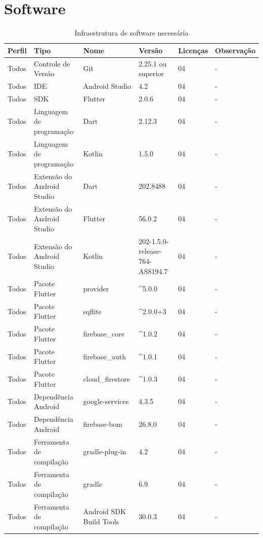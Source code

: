 \documentclass[
	12pt,				%
	oneside,			%
	a4paper,			%
	english,			%
	brazil,				%
	]{abntex2}
\begin{document}
\section{Software}
\begin{table}[ht]
\caption{Infraestrutura de software necessária}%
\label{tab:ambiente_software}
\centering
\IBGEtabfontsize
\begin{tabular}{@{}p{}p{}p{}p{}p{}p{}@{}}
\toprule
\textbf{Perfil} & \textbf{Tipo} & \textbf{Nome} & \textbf{Versão} & \textbf{Licenças}  & \textbf{Observação} \\ \midrule
Todos & Controle de Versão & Git & 2.25.1 ou superior & 04  & - \\ \midrule
Todos & IDE & Android Studio & 4.2 & 04  & - \\ \midrule
Todos & SDK & Flutter & 2.0.6 & 04  & - \\ \midrule
Todos & Linguagem de programação & Dart & 2.12.3 & 04  & - \\ \midrule
Todos & Linguagem de programação & Kotlin & 1.5.0 & 04  & - \\ \midrule
Todos & Extensão do Android Studio & Dart & 202.8488 & 04  & - \\ \midrule
Todos & Extensão do Android Studio & Flutter & 56.0.2 & 04  & - \\ \midrule
Todos & Extensão do Android Studio & Kotlin & 202-1.5.0-release-764-AS8194.7 & 04  & - \\ \midrule
Todos & Pacote Flutter & provider & \^{}5.0.0 & 04 & - \\ \midrule
Todos & Pacote Flutter & sqflite & \^{}2.0.0+3 & 04 & - \\ \midrule
Todos & Pacote Flutter & firebase\_core & \^{}1.0.2 & 04 & - \\ \midrule
Todos & Pacote Flutter & firebase\_auth & \^{}1.0.1 & 04  & - \\ \midrule
Todos & Pacote Flutter & cloud\_firestore & \^{}1.0.3 & 04  & - \\ \midrule
Todos & Dependência Android & google-services & 4.3.5 & 04  & - \\ \midrule
Todos & Dependência Android & firebase-bom & 26.8.0 & 04  & - \\ \midrule
Todos & Ferramenta de compilação & gradle-plug-in & 4.2 & 04  & - \\ \midrule
Todos & Ferramenta de compilação & gradle & 6.9 & 04  & - \\ \midrule
Todos & Ferramenta de compilação & Android SDK Build Tools & 30.0.3 & 04  & - \\ \bottomrule
\end{tabular}%
\end{table}
\end{document}
